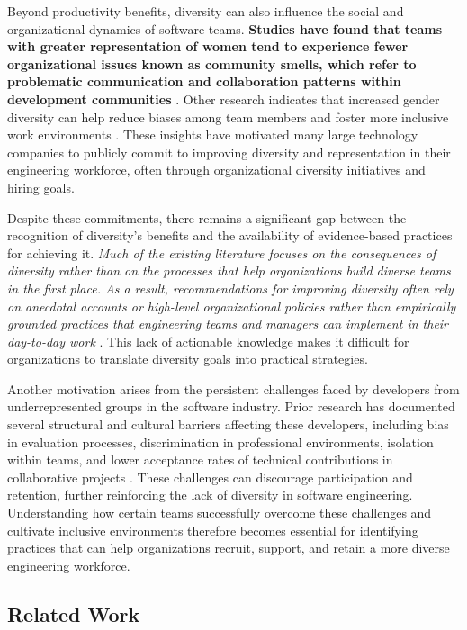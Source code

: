 Beyond productivity benefits, diversity can also influence the social and organizational dynamics of software teams. \textbf{Studies have found that teams with greater representation of women tend to experience fewer organizational issues known as community smells, which refer to problematic communication and collaboration patterns within development communities} \cite{catolino2019gender}. Other research indicates that increased gender diversity can help reduce biases among team members and foster more inclusive work environments \cite{wang2019implicit}. These insights have motivated many large technology companies to publicly commit to improving diversity and representation in their engineering workforce, often through organizational diversity initiatives and hiring goals.

Despite these commitments, there remains a significant gap between the recognition of diversity's benefits and the availability of evidence-based practices for achieving it. \textit{Much of the existing literature focuses on the consequences of diversity rather than on the processes that help organizations build diverse teams in the first place. As a result, recommendations for improving diversity often rely on anecdotal accounts or high-level organizational policies rather than empirically grounded practices that engineering teams and managers can implement in their day-to-day work} \cite{kreitz2008best}. This lack of actionable knowledge makes it difficult for organizations to translate diversity goals into practical strategies.

Another motivation arises from the persistent challenges faced by developers from underrepresented groups in the software industry. Prior research has documented several structural and cultural barriers affecting these developers, including bias in evaluation processes, discrimination in professional environments, isolation within teams, and lower acceptance rates of technical contributions in collaborative projects \cite{nadri2022relationship,terrell2017gender}. These challenges can discourage participation and retention, further reinforcing the lack of diversity in software engineering. Understanding how certain teams successfully overcome these challenges and cultivate inclusive environments therefore becomes essential for identifying practices that can help organizations recruit, support, and retain a more diverse engineering workforce.

\subsection{Related Work}

